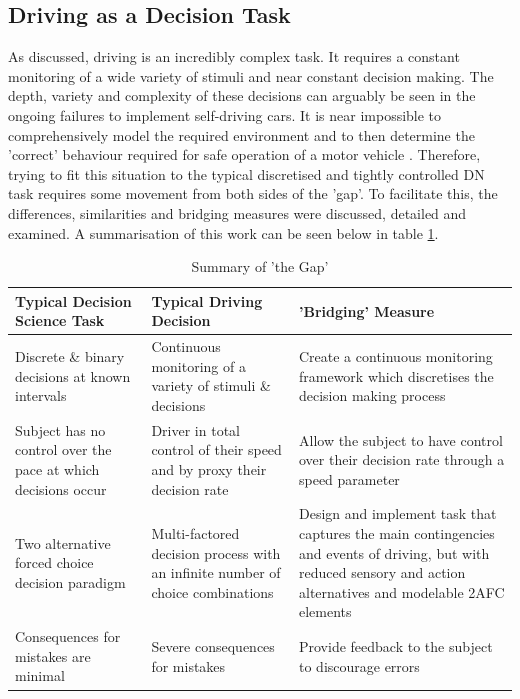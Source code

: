 \subsection{Driving as a Decision Task}
As discussed, driving is an incredibly complex task. It requires a constant monitoring of a wide variety of stimuli and near constant decision making. The depth, variety and complexity of these decisions can arguably be seen in the ongoing failures to implement self-driving cars. It is near impossible to comprehensively model the required environment and to then determine the 'correct' behaviour required for safe operation of a motor vehicle \citep{wolmarDriverlessCarsRoad2020}. Therefore, trying to fit this situation to the typical discretised and tightly controlled DN task requires some movement from both sides of the 'gap'. To facilitate this, the differences, similarities and bridging measures were discussed, detailed and examined. A summarisation of this work can be seen below in table \ref{tab:gap}.

\citep{wolmarDriverlessCarsRoad2020}

\begin{table}[H]
    \begin{center}
        \caption{Summary of 'the Gap'}
        \label{tab:gap}
        \resizebox{\textwidth}{!} {
        \begin{tabular}{p{}|p{}|p{}}
        \hline
        Typical Decision Science Task & Typical Driving Decision & 'Bridging' Measure \\ \hline
        Discrete \& binary decisions at known intervals & Continuous monitoring of a variety of stimuli \& decisions & Create a continuous monitoring framework which discretises the decision making process \\ \hline
        Subject has no control over the pace at which decisions occur   & Driver in total control of their speed and by proxy their decision rate  & Allow the subject to have control over their decision rate through a speed parameter \\\hline
        Two alternative forced choice decision paradigm  & Multi-factored decision process with an infinite number of choice combinations  & Design and implement task that captures the main contingencies and events of driving, but with reduced sensory and action alternatives and modelable 2AFC elements\\\hline
        Consequences for mistakes are minimal & Severe consequences for mistakes  & Provide feedback to the subject to discourage errors\\ \hline
        \end{tabular}}
    \end{center}
\end{table}

